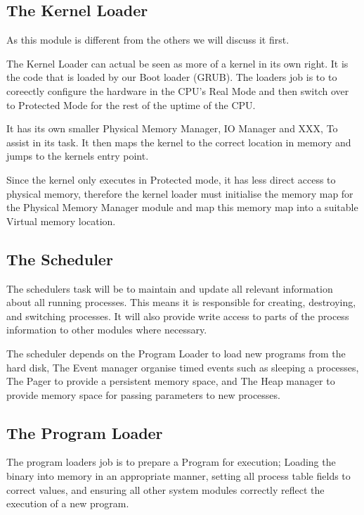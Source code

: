 \documentclass[a4paper]{report}
\begin{document}
\subsection{The Kernel Loader}

As this module is different from the others we will discuss it first.

The Kernel Loader can actual be seen as more of a kernel in its own right. It is the code that is loaded by our Boot loader (GRUB). The loaders job is to to coreectly configure the hardware in the CPU's Real Mode and then switch over to Protected Mode for the rest of the uptime of the CPU.

It has its own smaller Physical Memory Manager, IO Manager and XXX, To assist in its task. It then maps the kernel to the correct location in memory and jumps to the kernels entry point.

Since the kernel only executes in Protected mode, it has less direct access to physical memory, therefore the kernel loader must initialise the memory map for the Physical Memory Manager module and map this memory map into a suitable Virtual memory location.

\subsection{The Scheduler}

The schedulers task will be to maintain and update all relevant information about all running processes. This means it is responsible for creating, destroying, and switching processes. It will also provide write access to parts of the process information to other modules where necessary.

The scheduler depends on the Program Loader to load new programs from the hard disk, The Event manager organise timed events such as sleeping a processes, The Pager to provide a persistent memory space, and The Heap manager to provide memory space for passing parameters to new processes.

\subsection{The Program Loader}

The program loaders job is to prepare a Program for execution; Loading the binary into memory in an appropriate manner, setting all process table fields to correct values, and ensuring all other system modules correctly reflect the execution of a new program.
\end{document}
